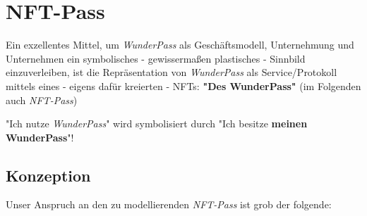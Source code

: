 
\newpage

\section{NFT-Pass}
\label{sec:nft-pass}

Ein exzellentes Mittel, um \textit{WunderPass} als Geschäftsmodell, Unternehmung und Unternehmen ein symbolisches - gewissermaßen plastisches - Sinnbild einzuverleiben, ist die Repräsentation von \textit{WunderPass} als Service/Protokoll mittels eines - eigens dafür kreierten - NFTs: \textbf{"Des WunderPass"} (im Folgenden auch \textit{NFT-Pass})

\vspace{0.3cm}

\begin{Fazit}

"Ich nutze \textit{WunderPass}" wird symbolisiert durch "Ich besitze \textbf{meinen WunderPass}"!

\end{Fazit}

\vspace{0.3cm}

\subsection{Konzeption}

\vspace{0.3cm}

Unser Anspruch an den zu modellierenden \textit{NFT-Pass} ist grob der folgende:

\vspace{0.2cm}

